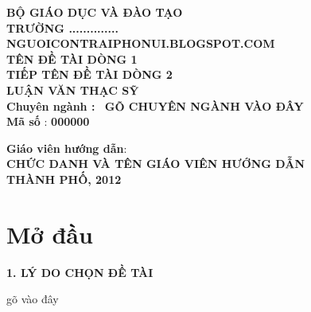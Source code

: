 ﻿\documentclass[12pt,a4paper,openany,oneside]{report}
\def\n{\noindent}
\def\m{\medskip}
\def\m{\medskip}
\def\n{\noindent}
\begin{document}
\fontsize{14pt}{14pt}\selectfont \baselineskip 0.65cm
\thispagestyle{empty}
\begin{center}
\MakeUppercase{{\bf\small Bộ giáo dục và Đào tạo}}\\
\MakeUppercase{{\bf\small Trường ..............}}\\
\vspace{2cm}
\MakeUppercase{\textsc{{\large\bf  nguoicontraiphonui.blogspot.com}}}\\
\vspace{1.8cm}
\textbf{\MakeUppercase{\textsc{\huge\bf Tên đề tài dòng 1}}}\\
\textbf{\MakeUppercase{\textsc{\huge\bf tiếp tên đề tài dòng 2}}}\\
\vspace{2.5cm }
\MakeUppercase{\textsc{{\bf \small  Luận văn Thạc sỹ}}}\\
\vspace{2.0cm }
{\large \bf Chuyên ngành :\textbf{\MakeUppercase{\textsc{\small{\,\,\, gõ chuyên ngành vào đây}}}}}\\

{\large\bf  Mã số} : {{\bf\large   00\hspace*{0.25cm}00\hspace*{0.15cm}00}}\\
\end{center}
\vspace{0.5cm}
\begin{center}
{\large\bf Giáo viên hướng dẫn}:\\
\MakeUppercase{\textsc{{\bf\small chức danh và tên giáo viên hướng dẫn}}}\\
\vspace{1.8cm}
\MakeUppercase{\textsc{{\footnotesize \bf Thành phố, 2012}}}
\end{center}

\tableofcontents
\newpage

\chapter*{Mở đầu}

\n \MakeUppercase{\bf 1. Lý do chọn đề tài}

\n gõ vào đây
\m

\m
\end{document}
